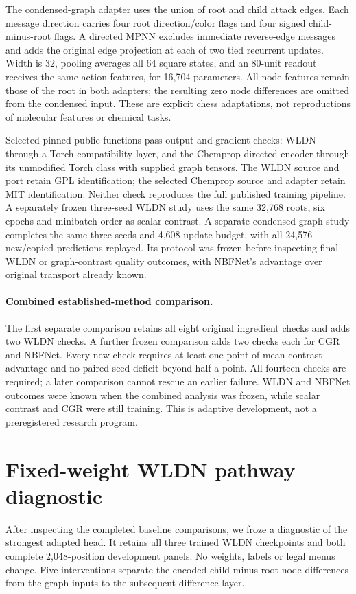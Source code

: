 The condensed-graph adapter \citep{heid2022} uses the union of root and child
attack edges. Each message direction carries four root direction/color flags
and four signed child-minus-root flags. A directed MPNN excludes immediate
reverse-edge messages and adds the original edge projection at each of two
tied recurrent updates. Width is 32, pooling averages all 64 square states,
and an 80-unit readout receives the same action features, for 16,704 parameters.
All node features remain those of the root in both adapters; the resulting
zero node differences are omitted from the condensed input. These are explicit
chess adaptations, not reproductions of molecular features or chemical tasks.

Selected pinned public functions pass output and gradient checks: WLDN through
a Torch compatibility layer, and the Chemprop directed encoder through its
unmodified Torch class with supplied graph tensors. The WLDN source and port
retain GPL identification; the selected Chemprop source and adapter retain MIT
identification. Neither check reproduces the full published training pipeline.
\DifferenceBaselineEngineering{}
A separately frozen three-seed WLDN study uses the same 32,768 roots, six epochs
and minibatch order as scalar contrast. \WLDNQualityResult{}
A separate condensed-graph study completes the same three seeds and 4,608-update
budget, with all 24,576 new/copied predictions replayed. Its protocol was frozen
before inspecting final WLDN or graph-contrast quality outcomes, with NBFNet's
advantage over original transport already known.

\paragraph{Combined established-method comparison.}
\label{app:graph-baselines}
The first separate comparison retains all eight original ingredient checks and
adds two WLDN checks. A further frozen comparison adds two checks each for CGR
and NBFNet. Every new check requires at least one point of mean contrast
advantage and no paired-seed deficit beyond half a point. All fourteen checks
are required; a later comparison cannot rescue an earlier failure. WLDN and
NBFNet outcomes were known when the combined analysis was frozen, while scalar
contrast and CGR were still training. This is adaptive development, not a
preregistered research program.

\FloatBarrier
\GraphBaselineResult{}

\FloatBarrier
\section{Fixed-weight WLDN pathway diagnostic}
\label{app:wldn-pathways}
After inspecting the completed baseline comparisons, we froze a diagnostic of
the strongest adapted head. It retains all three trained WLDN checkpoints and
both complete 2,048-position development panels. No weights, labels or legal
menus change. Five interventions separate the encoded child-minus-root node
differences from the graph inputs to the subsequent difference layer.

